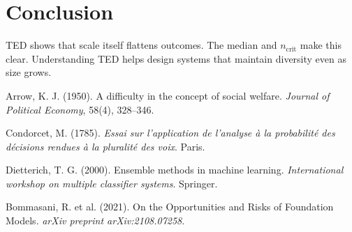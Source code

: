 \documentclass[12pt]{article}
\begin{document}
\section{Conclusion}
TED shows that scale itself flattens outcomes. The median and 
$n_{\text{crit}}$ make this clear. Understanding TED helps design 
systems that maintain diversity even as size grows.


\begin{thebibliography}{9}

Arrow, K. J. (1950).
A difficulty in the concept of social welfare.
\textit{Journal of Political Economy}, 58(4), 328–346.

Condorcet, M. (1785).
\textit{Essai sur l'application de l'analyse à la probabilité des décisions rendues à la pluralité des voix}. Paris.

Dietterich, T. G. (2000).
Ensemble methods in machine learning.
\textit{International workshop on multiple classifier systems}. Springer.

Bommasani, R. et al. (2021).
On the Opportunities and Risks of Foundation Models.
\textit{arXiv preprint arXiv:2108.07258}.

\end{thebibliography}
\end{document}
